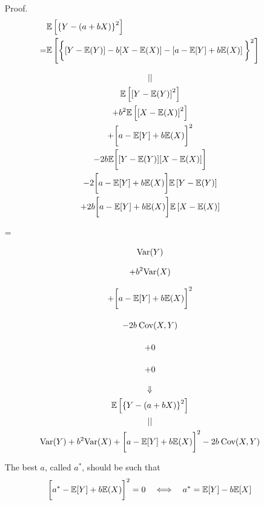 \begin{frame}[fragile]

\begin{enumerate}
\item[Proof.]
\begin{align*}
&\mathbb{E}\left[ \left\{ Y - \left( a+b X\right )\right\}^2  \right ]\\
=&
\mathbb{E}\left[ \bigg\{ [Y-\mathbb{E}(Y)] - b[X-\mathbb{E}(X)] - \left[ a-\mathbb{E}[Y] +b \mathbb{E}(X)\right ]\bigg\}^2  \right ]
\end{align*}
\item[]
\begin{minipage}{0.5\textwidth}
	\begin{gather*}
	||\\
\mathbb{E}\left[ \left[Y-\mathbb{E}(Y)\right]^2  \right ]\\
+
b^2 \mathbb{E}\left[ \left[X-\mathbb{E}(X)\right]^2 \right]\\
+ \bigg[ a-\mathbb{E}[Y] +b \mathbb{E}(X)\bigg]^2\\
-2b
\mathbb{E}\bigg[ [Y-\mathbb{E}(Y)] [X-\mathbb{E}(X)] \bigg]\\
-2\bigg[ a-\mathbb{E}[Y] +b \mathbb{E}(X)\bigg] \mathbb{E}\left[ Y-\mathbb{E}(Y)\right]\\
+2b\bigg[ a-\mathbb{E}[Y] +b \mathbb{E}(X)\bigg] \mathbb{E}\left[ X-\mathbb{E}(X)\right]
	\end{gather*}
\end{minipage}
\pause \hfill =\hfill
\begin{minipage}{0.3\textwidth}
	\begin{gather*}
		\text{Var}(Y) \\[0.7em]
		+b^2 \text{Var}(X)\\[0.7em]
		+ \bigg[ a-\mathbb{E}[Y] +b \mathbb{E}(X)\bigg]^2\\[1em]
		-2b\: \text{Cov}(X,Y)\\[1.1em]
		+ 0 \\[1.1em]
+0
	\end{gather*}
\end{minipage}
\end{enumerate}
\end{frame}
\begin{frame}[fragile]

	\begin{enumerate}
		\item[]
	\begin{gather*}
		\Downarrow\\
\mathbb{E}\left[ \left\{ Y - \left( a+b X\right )\right\}^2  \right ]\\
|| \\
		 \text{Var}(Y)
		+b^2 \text{Var}(X)
		+ \bigg[ a-\mathbb{E}[Y] +b \mathbb{E}(X)\bigg]^2
		-2b\: \text{Cov}(X,Y)
	\end{gather*}
	\vfill
\item[] The best $a$, called $a^*$, should be such that
	\vfill
	\[
		 \bigg[ a^*-\mathbb{E}[Y] +b \mathbb{E}(X)\bigg]^2 = 0
		 \quad\Longleftrightarrow\quad
		 a^* = \mathbb{E}[Y]-b\mathbb{E}[X]
	\]
	\end{enumerate}
\end{frame}
